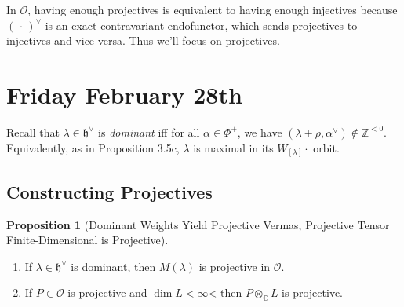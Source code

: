 \documentclass[11pt]{scrartcl}
\theoremstyle{definition}
\theoremstyle{theorem}
\newtheorem{proposition}[theorem]{Proposition}
\theoremstyle{proof}
\theoremstyle{definition}
\theoremstyle{break}
\theoremstyle{problem}
\newcommand{\CC}[0]{{\mathbb{C}}}
\newcommand{\ZZ}[0]{{\mathbb{Z}}}
\newcommand{\dual}[0]{^\vee}
\newcommand{\lieh}[0]{{\mathfrak{h}}}
\newcommand{\OO}[0]{{\mathcal{O}}}
\newcommand{\tensor}[0]{\otimes}
\newcommand{\wait}[0]{{\,\cdot\,}}
\begin{document}
In \(\OO\), having enough projectives is equivalent to having enough
injectives because \((\wait)\dual\) is an exact contravariant
endofunctor, which sends projectives to injectives and vice-versa. Thus
we'll focus on projectives.

\hypertarget{friday-february-28th}{%
\section{Friday February 28th}\label{friday-february-28th}}

Recall that \(\lambda \in \lieh\dual\) is \emph{dominant} iff for all
\(\alpha \in \Phi^+\), we have
\((\lambda + \rho, \alpha\dual) \not\in\ZZ^{<0}\). Equivalently, as in
Proposition 3.5c, \(\lambda\) is maximal in its \(W_{[\lambda]}\cdot\)
orbit.

\hypertarget{constructing-projectives}{%
\subsection{Constructing Projectives}\label{constructing-projectives}}

\begin{proposition}[Dominant Weights Yield Projective Vermas, Projective Tensor Finite-Dimensional is Projective]

\begin{enumerate}
\def\labelenumi{\alph{enumi}.}
\item
  If \(\lambda \in \lieh\dual\) is dominant, then \(M(\lambda)\) is
  projective in \(\OO\).
\item
  If \(P\in \OO\) is projective and \(\dim L < \infty\)\textless{} then
  \(P \tensor_\CC L\) is projective.
\end{enumerate}

\end{proposition}
\end{document}
